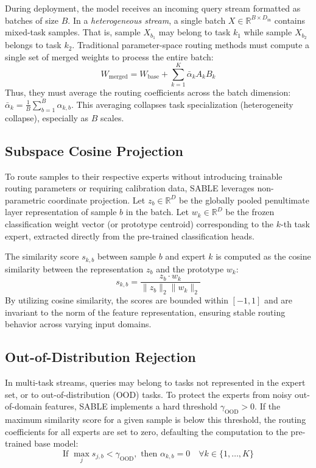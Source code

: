 During deployment, the model receives an incoming query stream formatted as batches of size $B$. In a \emph{heterogeneous stream}, a single batch $X \in \mathbb{R}^{B \times D_{\text{in}}}$ contains mixed-task samples. That is, sample $X_{b_1}$ may belong to task $k_1$ while sample $X_{b_2}$ belongs to task $k_2$. Traditional parameter-space routing methods must compute a single set of merged weights to process the entire batch:
\begin{equation}
W_{\text{merged}} = W_{\text{base}} + \sum_{k=1}^K \bar{\alpha}_k A_k B_k
\label{eq:param_merged}
\end{equation}
Thus, they must average the routing coefficients across the batch dimension: $\bar{\alpha}_k = \frac{1}{B} \sum_{b=1}^B \alpha_{k, b}$. This averaging collapses task specialization (heterogeneity collapse), especially as $B$ scales.

\subsection{Subspace Cosine Projection}
To route samples to their respective experts without introducing trainable routing parameters or requiring calibration data, SABLE leverages non-parametric coordinate projection. Let $z_b \in \mathbb{R}^D$ be the globally pooled penultimate layer representation of sample $b$ in the batch. Let $w_k \in \mathbb{R}^D$ be the frozen classification weight vector (or prototype centroid) corresponding to the $k$-th task expert, extracted directly from the pre-trained classification heads.

The similarity score $s_{k, b}$ between sample $b$ and expert $k$ is computed as the cosine similarity between the representation $z_b$ and the prototype $w_k$:
\begin{equation}
s_{k, b} = \frac{z_b \cdot w_k}{\|z_b\|_2 \|w_k\|_2}
\label{eq:similarity}
\end{equation}
By utilizing cosine similarity, the scores are bounded within $[-1, 1]$ and are invariant to the norm of the feature representation, ensuring stable routing behavior across varying input domains.

\subsection{Out-of-Distribution Rejection}
In multi-task streams, queries may belong to tasks not represented in the expert set, or to out-of-distribution (OOD) tasks. To protect the experts from noisy out-of-domain features, SABLE implements a hard threshold $\gamma_{\text{OOD}} > 0$. If the maximum similarity score for a given sample is below this threshold, the routing coefficients for all experts are set to zero, defaulting the computation to the pre-trained base model:
\begin{equation}
\text{If } \max_{j} s_{j, b} < \gamma_{\text{OOD}}, \text{ then } \alpha_{k, b} = 0 \quad \forall k \in \{1, \dots, K\}
\label{eq:ood}
\end{equation}

